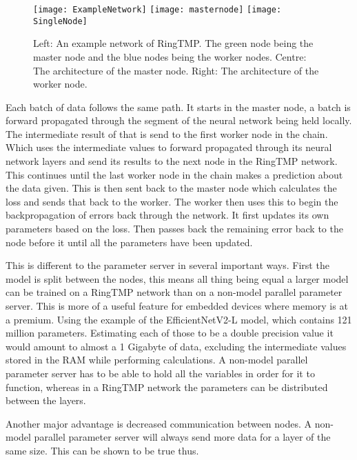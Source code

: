 \begin{figure}[h]
    \texttt{[image: ExampleNetwork]}
    \texttt{[image: masternode]}
    \texttt{[image: SingleNode]}
    \caption{Left: An example network of RingTMP. The green node being the
            master node and the blue nodes being the worker nodes. Centre: The
            architecture of the master node. Right: The architecture of the
            worker node.}
\end{figure}

Each batch of data follows the same path. It starts in the master node, a batch
is forward propagated through the segment of the neural network being held
locally. The intermediate result of that is send to the first worker node in the
chain. Which uses the intermediate values to forward propagated through its
neural network layers and send its results to the next node in the RingTMP
network. This continues until the last worker node in the chain makes a
prediction about the data given. This is then sent back to the master node which
calculates the loss and sends that back to the worker. The worker then uses this
to begin the backpropagation of errors back through the network. It first
updates its own parameters based on the loss. Then passes back the remaining
error back to the node before it until all the parameters have been updated.

This is different to the parameter server in several important ways. First the
model is split between the nodes, this means all thing being equal a larger
model can be trained on a RingTMP network than on a non-model parallel parameter
server. This is more of a useful feature for embedded devices where memory is at
a premium. Using the example of the EfficientNetV2-L model, which contains 121
million parameters. \cite{tan2021efficientnetv2} Estimating each of those to be
a double precision value it would amount to almost a 1 Gigabyte of data,
excluding the intermediate values stored in the RAM while performing
calculations. A non-model parallel parameter server has to be able to hold all
the variables in order for it to function, whereas in a RingTMP network the
parameters can be distributed between the layers.

Another major advantage is decreased communication between nodes. A non-model
parallel parameter server will always send more data for a
layer of the same size. This can be shown to be true thus.

